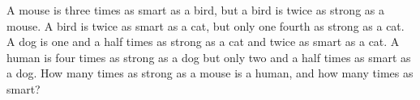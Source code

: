 A mouse is three times as smart as a bird, but a bird is twice as strong as a mouse. A bird is twice as smart as a cat, but only one fourth as strong as a cat. A dog is one and a half times as strong as a cat and twice as smart as a cat. A human is four times as strong as a dog but only two and a half times as smart as a dog. How many times as strong as a mouse is a human, and how many times as smart?
